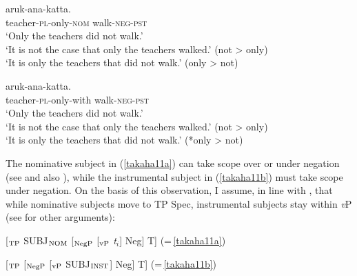 \documentclass[output=paper]{langscibook}
\begin{document}
\begin{exe}
\ex \label{takaha11}
\begin{xlist}
\ex \label{takaha11a}
 {aruk-ana-katta}.\\
teacher-\textsc{pl}-only-\textsc{nom} walk-\textsc{neg}-\textsc{pst}\\
\glt `Only the teachers did not walk.'\\
`It is not the case that only the teachers walked.' (not \textgreater{} only)\\
`It is only the teachers that did not walk.’ (only \textgreater{} not)

\ex \label{takaha11b}
 {aruk-ana-katta}.\\
teacher-\textsc{pl}-only-with walk-\textsc{neg}-\textsc{pst}\\
\glt `Only the teachers did not walk.’  \\
‘It is not the case that only the teachers walked.' (not \textgreater{} only)\\
`It is only the teachers that did not walk.’ (*only \textgreater{} not)\\
\end{xlist}
\end{exe}

The nominative subject in (\ref{takaha11a}) can take scope over or under negation (see \citealt{Sakai2000} and also \citealt{Kataoka2006}), while the instrumental subject in (\ref{takaha11b}) must take scope under negation. On the basis of this observation, I assume, in line with \citet{Kishimoto2010}, that while nominative subjects move to TP Spec, instrumental subjects stay within \emph{v}P (see \citealt{Kishimoto2010} for other arguments):

\begin{exe}
\ex 
\begin{xlist}
\ex \label{takaha12a} [$_{\textnormal{TP}}$ \hspace{2mm} SUBJ$_{\textnormal{NOM}}$ \hspace{2mm} [$_{\textnormal{NegP}}$ \hspace{1mm} [$_{\textnormal{vP}}$ \hspace{8mm} \emph{t}$_{i}$\hspace{8mm}] Neg] T] (=\,\ref{takaha11a})

\ex \label{takaha12b} [$_{\textnormal{TP}}$ \hspace{21mm} [$_{\textnormal{NegP}}$ \hspace{1mm} [$_{\textnormal{vP}}$ \hspace{1.7mm} SUBJ$_{\textnormal{INST}}$\hspace{1.7mm}] Neg] T] (=\,\ref{takaha11b})
\end{xlist}
\end{exe}
\end{document}
